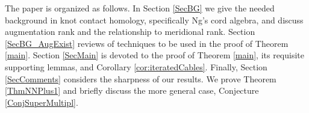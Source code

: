 \documentclass[11pt]{amsart}
\def\C{{\mathbb C}}
\def\A{{\mathcal A}}
\newtheorem{cor}[thm]{Corollary}
\theoremstyle{definition}
\begin{document}


The paper is organized as follows. In Section \ref{SecBG} we give the needed background in knot contact homology, specifically Ng's cord algebra, and discuss augmentation rank and the relationship to meridional rank. Section \ref{SecBG_AugExist} reviews of techniques to be used in the proof of Theorem \ref{main}. Section \ref{SecMain} is devoted to the proof of Theorem \ref{main}, its requisite supporting lemmas, and Corollary \ref{cor:iteratedCables}. Finally, Section \ref{SecComments} considers the sharpness of our results. We prove Theorem \ref{ThmNNPlus1} and briefly discuss the more general case, Conjecture \ref{ConjSuperMultipl}.













\end{document}
